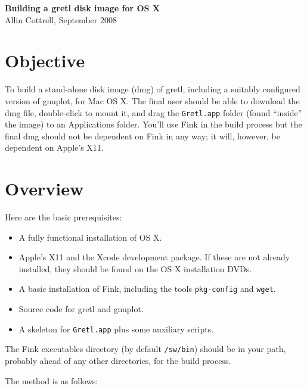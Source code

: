 \documentclass{article}
\begin{document}
\setlength{\parskip}{1ex}
\setlength{\parindent}{0pt}

\begin{center}
  {\Large \textbf{Building a gretl disk image for OS X}}\\[6pt]
Allin Cottrell, September 2008
\end{center}

\section{Objective}

To build a stand-alone disk image (dmg) of gretl, including a suitably
configured version of gnuplot, for Mac OS X.  The final user should be
able to download the dmg file, double-click to mount it, and drag the
\texttt{Gretl.app} folder (found ``inside'' the image) to an
Applications folder.  You'll use Fink in the build process but the
final dmg should not be dependent on Fink in any way; it will,
however, be dependent on Apple's X11.

\section{Overview}

Here are the basic prerequisites:

\begin{itemize}
\item A fully functional installation of OS X.
\item Apple's X11 and the Xcode development package.  If these are
  not already installed, they should be found on the OS X installation
  DVDs.
\item A basic installation of Fink, including the tools
  \texttt{pkg-config} and \texttt{wget}.
\item Source code for gretl and gnuplot.
\item A skeleton for \texttt{Gretl.app} plus some auxiliary scripts.
\end{itemize}

The Fink executables directory (by default \texttt{/sw/bin}) should be
in your path, probably ahead of any other directories, for the build
process.

The method is as follows:
\end{document}
